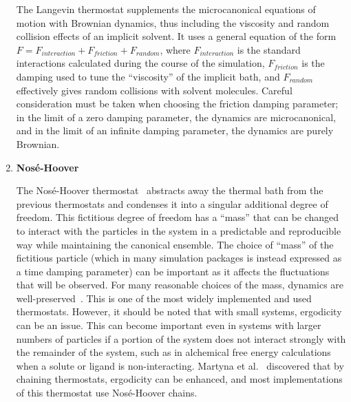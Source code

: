 \documentclass[9pt,bestpractices]{livecoms}
\begin{document}
\begin{enumerate}[listparindent=\parindent]
        The Langevin\cite{schneider1978molecular} thermostat supplements the microcanonical equations of motion with Brownian dynamics, thus including the viscosity and random collision effects of an implicit solvent.
        It uses a general equation of the form $F = F_{interaction} + F_{friction} + F_{random}$, where $F_{interaction}$ is the standard interactions calculated during the course of the simulation, $F_{friction}$ is the damping used to tune the ``viscosity'' of the implicit bath, and $F_{random}$ effectively gives random collisions with solvent molecules.
        Careful consideration must be taken when choosing the friction damping parameter; in the limit of a zero damping parameter, the dynamics are microcanonical, and in the limit of an infinite damping parameter, the dynamics are purely Brownian.

    \item {\bf{Nos\'{e}-Hoover}}

        The Nos\'{e}-Hoover thermostat~\cite{thermostatAlgorithms2005} abstracts away the thermal bath from the previous thermostats and condenses it into a singular additional degree of freedom.
        This fictitious degree of freedom has a ``mass'' that can be changed to interact with the particles in the system in a predictable and reproducible way while maintaining the canonical ensemble.
        The choice of ``mass'' of the fictitious particle (which in many simulation packages is instead expressed as a time damping parameter) can be important as it affects the fluctuations that will be observed.
        For many reasonable choices of the mass, dynamics are well-preserved~\cite{Basconi:2013:JChemTheoryComput}.
        This is one of the most widely implemented and used thermostats.
        However, it should be noted that with small systems, ergodicity can be an issue\cite{martyna1992nose,thermostatAlgorithms2005}.
        This can become important even in systems with larger numbers of particles if a portion of the system does not interact strongly with the remainder of the system, such as in alchemical free energy calculations when a solute or ligand is non-interacting.
        Martyna et al.~\cite{martyna1992nose} discovered that by chaining thermostats, ergodicity can be enhanced, and most implementations of this thermostat use Nos\'{e}-Hoover chains.

\end{enumerate}
\end{document}

